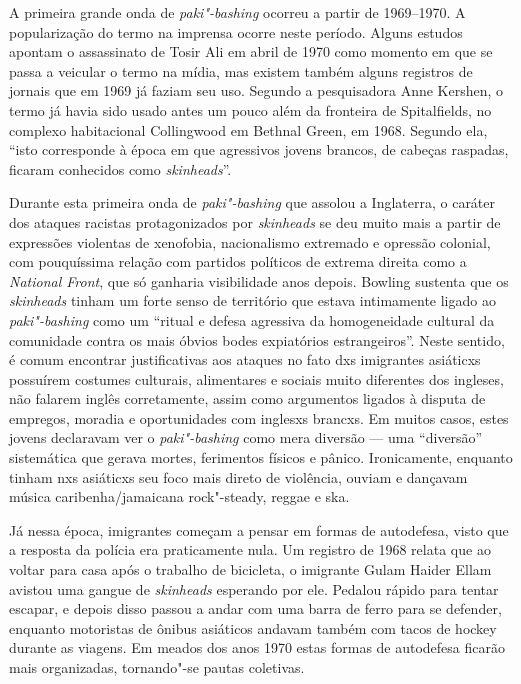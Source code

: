 A primeira grande onda de \emph{paki"-bashing} ocorreu a partir de 1969--1970. A popularização do termo na imprensa ocorre neste período. Alguns estudos apontam o assassinato de Tosir Ali em abril de 1970 como momento em que se passa a veicular o termo na mídia, mas existem também alguns registros de jornais que em 1969 já faziam seu uso. Segundo a pesquisadora Anne Kershen, o termo já havia sido usado antes um pouco além da fronteira de Spitalfields, no complexo habitacional Collingwood em Bethnal Green, em 1968. Segundo ela, ``isto corresponde à época em que agressivos jovens brancos, de cabeças raspadas, ficaram conhecidos como \emph{skinheads}''.

Durante esta primeira onda de \emph{paki"-bashing} que assolou a Inglaterra, o caráter dos ataques racistas protagonizados por \emph{skinheads} se deu muito mais a partir de expressões violentas de xenofobia, nacionalismo extremado e opressão colonial, com pouquíssima relação com partidos políticos de extrema direita como a \emph{National Front}, que só ganharia visibilidade anos depois. Bowling sustenta que os \emph{skinheads} tinham um forte senso de território que estava intimamente ligado ao \emph{paki"-bashing} como um ``ritual e defesa agressiva da homogeneidade cultural da comunidade contra os mais óbvios bodes expiatórios estrangeiros''. Neste sentido, é comum encontrar justificativas aos ataques no fato dxs imigrantes asiáticxs possuírem costumes culturais, alimentares e sociais muito diferentes dos ingleses, não falarem inglês corretamente, assim como argumentos ligados à disputa de empregos, moradia e oportunidades com inglesxs brancxs. Em muitos casos, estes jovens declaravam ver o \emph{paki"-bashing} como mera diversão --- uma ``diversão'' sistemática que gerava mortes, ferimentos físicos e pânico. Ironicamente, enquanto tinham nxs asiáticxs seu foco mais direto de violência, ouviam e dançavam música caribenha/jamaicana rock"-steady, reggae e ska.

Já nessa época, imigrantes começam a pensar em formas de autodefesa, visto que a resposta da polícia era praticamente nula. Um registro de 1968 relata que ao voltar para casa após o trabalho de bicicleta, o imigrante Gulam Haider Ellam avistou uma gangue de \emph{skinheads} esperando por ele. Pedalou rápido para tentar escapar, e depois disso passou a andar com uma barra de ferro para se defender, enquanto motoristas de ônibus asiáticos andavam também com tacos de hockey durante as viagens. Em meados dos anos 1970 estas formas de autodefesa ficarão mais organizadas, tornando"-se pautas coletivas.

